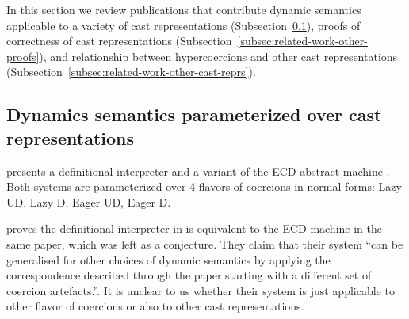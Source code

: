 \documentclass[runningheads]{llncs}
\begin{document}
  
In this section we review publications that contribute dynamic semantics
applicable to a variety of cast representations
(Subsection~\ref{subsec:parameterized-dynamics}),
proofs of correctness of cast representations
(Subsection~\ref{subsec:related-work-other-proofs}),
and relationship between hypercoercions and other cast representations
(Subsection~\ref{subsec:related-work-other-cast-reprs}).

\subsection{Dynamics semantics parameterized over cast representations}
\label{subsec:parameterized-dynamics}

\cite{siek2012interpretations} presents a definitional interpreter
and a variant of the ECD abstract machine \citep{siek2012ECD}.
Both systems are parameterized over 4 flavors of coercions in normal
forms: Lazy UD, Lazy D, Eager UD, Eager D.

\citet{garcia2014deriving} proves the definitional interpreter
in \cite{siek2012interpretations}
is equivalent to the ECD machine in the same paper,
which was left as a conjecture. 
They claim that their system ``can be generalised for other choices
of dynamic semantics by applying the correspondence described 
through the paper starting with a different set of coercion artefacts.''.
It is unclear to us whether their system is just applicable
to other flavor of coercions or also to other cast representations.

\end{document}
